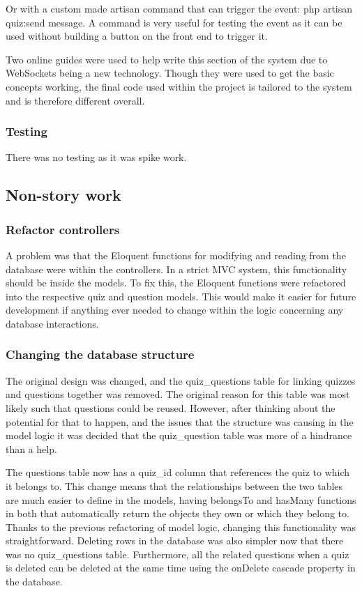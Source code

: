 Or with a custom made artisan command that can trigger the event: php artisan quiz:send {message}. A command is very useful for testing the event as it can be used without building a button on the front end to trigger it.

Two online guides were used to help write this section of the system due to WebSockets being a new technology\cite{pusher-guide}\cite{echo-guide}. Though they were used to get the basic concepts working, the final code used within the project is tailored to the system and is therefore different overall.
\subsubsection{Testing}
There was no testing as it was spike work.
\newpage

\subsection{Non-story work}
\subsubsection{Refactor controllers}
A problem was that the Eloquent functions for modifying and reading from the database were within the controllers. In a strict MVC system, this functionality should be inside the models. To fix this, the Eloquent functions were refactored into the respective quiz and question models. This would make it easier for future development if anything ever needed to change within the logic concerning any database interactions.
\subsubsection{Changing the database structure}
The original design was changed, and the quiz\_questions table for linking quizzes and questions together was removed. The original reason for this table was most likely such that questions could be reused. However, after thinking about the potential for that to happen, and the issues that the structure was causing in the model logic it was decided that the quiz\_question table was more of a hindrance than a help.

The questions table now has a quiz\_id column that references the quiz to which it belongs to. This change means that the relationships between the two tables are much easier to define in the models, having belongsTo and hasMany functions in both that automatically return the objects they own or which they belong to. Thanks to the previous refactoring of model logic, changing this functionality was straightforward. Deleting rows in the database was also simpler now that there was no quiz\_questions table. Furthermore, all the related questions when a quiz is deleted can be deleted at the same time using the onDelete cascade property in the database.

